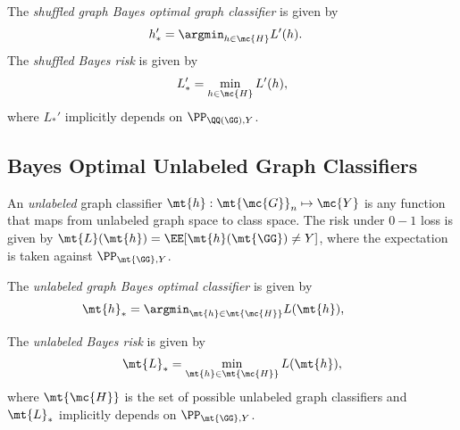 \documentclass[10pt,journal,cspaper,compsoc]{IEEEtran}
\begin{document}
The \emph{shuffled graph Bayes optimal graph classifier} is given by
\begin{align}
	h_*' &= \argmin_{h \in \mc{H}} L'(h). %
\end{align}
The \emph{shuffled Bayes risk} is given by
\begin{align}
	L_*' =\min_{h \in \mc{H}} L'(h),
\end{align}
where  $L_*'$ implicitly depends on $\PP_{\QQ(\GG),Y}$.  %

\subsection{Bayes Optimal Unlabeled Graph Classifiers} %


An \emph{unlabeled} graph classifier $\mt{h}: \mt{\mc{G}}_n \mapsto \mc{Y}$ is any function that maps from unlabeled graph space to class space. The risk under $0-1$ loss is given by $\mt{L}(\mt{h})=\EE[\mt{h}(\mt{\GG})\neq Y]$, where the expectation is taken against $\PP_{\mt{\GG},Y}$. 

The \emph{unlabeled graph Bayes optimal classifier} is given by %
\begin{align}
	\mt{h}_* &= \argmin_{\mt{h} \in \mt{\mc{H}}} L(\mt{h}), \qquad %
\end{align}



The \emph{unlabeled Bayes risk} is given by %
\begin{align}
	\mt{L}_* =\min_{\mt{h} \in \mt{\mc{H}}} L(\mt{h}),
\end{align}
where $\mt{\mc{H}}$ is the set of possible unlabeled graph classifiers
and $\mt{L}_*$ implicitly depends on $\PP_{\mt{\GG},Y}$.  

\end{document}
